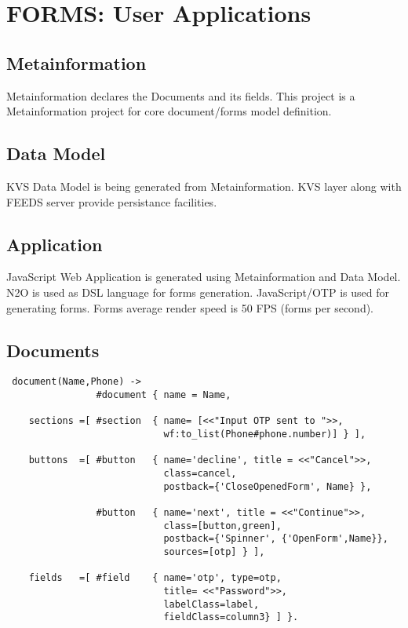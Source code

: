 \section{FORMS: User Applications}

\subsection{Metainformation}
Metainformation declares the Documents and its fields.
This project is a Metainformation project for core document/forms model definition.

\subsection{Data Model}
KVS Data Model is being generated from Metainformation.
KVS layer along with FEEDS server provide persistance facilities.

\subsection{Application}
JavaScript Web Application is generated using Metainformation and Data Model.
N2O is used as DSL language for forms generation.
JavaScript/OTP is used for generating forms.
Forms average render speed is 50 FPS (forms per second).

\subsection{Documents}

\vspace{1\baselineskip}
\begin{lstlisting}
 document(Name,Phone) ->
                #document { name = Name,

    sections =[ #section  { name= [<<"Input OTP sent to ">>,
                            wf:to_list(Phone#phone.number)] } ],

    buttons  =[ #button   { name='decline', title = <<"Cancel">>, 
                            class=cancel,
                            postback={'CloseOpenedForm', Name} },

                #button   { name='next', title = <<"Continue">>, 
                            class=[button,green],
                            postback={'Spinner', {'OpenForm',Name}},
                            sources=[otp] } ],

    fields   =[ #field    { name='otp', type=otp,
                            title= <<"Password">>,
                            labelClass=label, 
                            fieldClass=column3} ] }.
\end{lstlisting}

